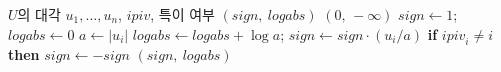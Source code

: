 \begin{algorithm}[t]
\begin{algorithmic}[1]
\Require $U$의 대각 $u_1,\dots,u_n$, $\mathit{ipiv}$, 특이 여부
\Ensure $(\mathit{sign},\ \mathit{logabs})$
 \Return $(0,\,-\infty)$ \EndIf
\State $\mathit{sign}\gets1$; $\mathit{logabs}\gets0$
  \State $a\gets|u_i|$ 
  \State $\mathit{logabs}\gets\mathit{logabs}+\log a$; $\mathit{sign}\gets\mathit{sign}\cdot(u_i/a)$
  \State \textbf{if} $\mathit{ipiv}_i\ne i$ \textbf{then} $\mathit{sign}\gets-\mathit{sign}$
\EndFor
\State \Return $(\mathit{sign},\ \mathit{logabs})$ 
\end{algorithmic}
\caption{부호와 로그 행렬식 (stardust 의 )}
\label{alg:lu-slogdet}
\end{algorithm}
